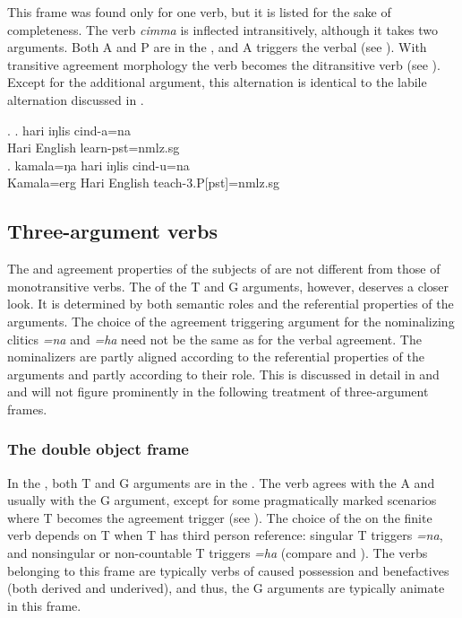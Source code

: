 
\noindent
This frame was found only for one verb, but it is listed for the sake of completeness. The verb \emph{cimma}  is inflected intransitively, although it takes two arguments. Both A and P are in the , and  A triggers the verbal  (see  \Next[a]). With transitive agreement morphology the verb becomes the ditransitive verb  (see \Next[b]). Except for the additional argument, this alternation is identical to the labile alternation discussed in . 

\ex. \ag. hari iŋlis cind-a=na\\
		Hari English learn{\sc [3sg]-pst=nmlz.sg}	\\
 	\bg. kamala=ŋa hari iŋlis cind-u=na\\
	Kamala{\sc =erg} Hari English teach{\sc -3.P[pst]=nmlz.sg}		\\

\subsection{Three-argument verbs}\label{three-arg-frame}

The  and agreement properties of the subjects of  are not different from those of monotransitive verbs. The  of the T and G arguments, however, deserves a closer look. It is determined  by both semantic roles and the referential properties of the arguments.  The choice of the agreement triggering argument for the nominalizing clitics \emph{=na} and \emph{=ha} need not be the same as for the verbal agreement. The nominalizers are partly aligned according to the referential properties of the arguments and partly according to their role. This is discussed in detail in  and  and will not figure prominently in the following treatment of three-argument frames.
 
\subsubsection{The double object frame}


\noindent
In the , both T and G arguments are in the  . The verb agrees with the A and usually with the G argument, except for some pragmatically marked scenarios where T becomes the agreement trigger (see ). The choice of the  on the finite verb depends on T when T has third person reference: singular T triggers \emph{=na}, and nonsingular or non-countable T triggers \emph{=ha} (compare \Next[b] and \Next[c]). The verbs belonging to this frame are typically verbs of caused possession and benefactives (both derived and underived), and thus, the G arguments are typically animate in this frame.
 

